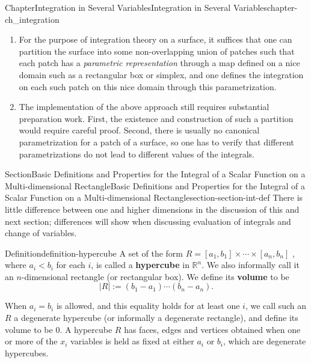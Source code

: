 \documentclass[oneside,10pt,]{book}
\newcommand{\terminology}[1]{\textbf{#1}}
\numberwithin{equation}{section}
\newcommand{\bbR}{\mathbb{R}}
\begin{document}
\begin{chapterptx}{Chapter}{Integration in Several Variables}{}{Integration in Several Variables}{}{}{chapter-ch_integration}
\begin{introduction}{}
\begin{enumerate}
\item{}For the purpose of integration theory on a surface, it suffices that one can partition the surface into some non-overlapping union of patches such that each patch has a \emph{parametric representation} through a map defined on a nice domain such as a rectangular box or simplex, and one defines the integration on each such patch on this nice domain through this parametrization.%
\item{}The implementation of the above approach still requires substantial preparation work. First, the existence and construction of such a partition would require careful proof. Second, there is usually no canonical parametrization for a patch of a surface, so one has to verify that different parametrizations do not lead to different values of the integrals.%
\end{enumerate}
\end{introduction}%
%
%
\typeout{************************************************}
\typeout{************************************************}
%
\begin{sectionptx}{Section}{Basic Definitions and Properties for the Integral of a Scalar Function on a Multi-dimensional Rectangle}{}{Basic Definitions and Properties for the Integral of a Scalar Function on a Multi-dimensional Rectangle}{}{}{section-section-int-def}
There is little difference between one and higher dimensions in the discussion of this and next section; differences will show when discussing evaluation of integrals and change of variables.%
\begin{definition}{Definition}{}{definition-hypercube}%
%
%
%
\label{notation-hypercube-d}%
A set of the form \(R=[a_{1}, b_{1}]\times \cdots \times [a_{n}, b_{n}]\) , where \(a_{i} < b_{i}\) for each \(i\), is called a \terminology{hypercube} in \(\bbR^{n}\). We also informally call it an \(n\)-dimensional rectangle (or rectangular box). We define its \terminology{volume} to be%
\begin{equation*}
|R| := (b_{1}-a_{1})\cdots (b_{n}-a_{n}).
\end{equation*}
%
\par
When \(a_{i}=b_{i}\) is allowed, and this equality holds for at least one \(i\), we call such an \(R\) a degenerate hypercube (or informally a degenerate rectangle), and define its volume to be \(0\). A hypercube \(R\) has faces, edges and vertices obtained when one or more of the \(x_{i}\) variables is held as fixed at either \(a_{i}\) or \(b_{i}\), which are degenerate hypercubes.%

\end{definition}
\end{sectionptx}
\end{chapterptx}
\end{document}
